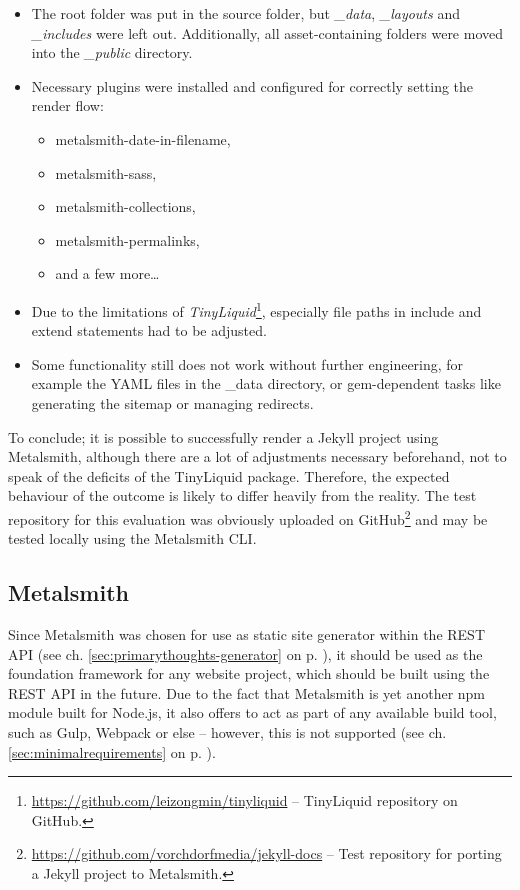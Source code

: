 \begin{itemize}
  \item The root folder was put in the source folder, but \emph{\_data}, \emph{\_layouts} and \emph{\_includes} were left out. Additionally, all asset-containing folders were moved into the \emph{\_public} directory.
  \item Necessary plugins were installed and configured for correctly setting the render flow:
  \begin{itemize}
    \item metalsmith-date-in-filename,
    \item metalsmith-sass,
    \item metalsmith-collections,
    \item metalsmith-permalinks,
    \item and a few more\ldots
  \end{itemize}
  \item Due to the limitations of \emph{TinyLiquid}\footnote{\url{https://github.com/leizongmin/tinyliquid} -- TinyLiquid repository on GitHub.}, especially file paths in include and extend statements had to be adjusted.
  \item Some functionality still does not work without further engineering, for example the YAML files in the \_data directory, or gem-dependent tasks like generating the sitemap or managing redirects.
\end{itemize}

To conclude; it is possible to successfully render a Jekyll project using Metalsmith, although there are a lot of adjustments necessary beforehand, not to speak of the deficits of the TinyLiquid package. Therefore, the expected behaviour of the outcome is likely to differ heavily from the reality. The test repository for this evaluation was obviously uploaded on GitHub\footnote{\url{https://github.com/vorchdorfmedia/jekyll-docs} -- Test repository for porting a Jekyll project to Metalsmith.} and may be tested locally using the Metalsmith CLI.

\subsection{Metalsmith}
Since Metalsmith was chosen for use as static site generator within the REST API (see ch. \ref{sec:primarythoughts-generator} on p. \pageref{sec:primarythoughts-generator}), it should be used as the foundation framework for any website project, which should be built using the REST API in the future. Due to the fact that Metalsmith is yet another npm module built for Node.js, it also offers to act as part of any available build tool, such as Gulp, Webpack or else -- however, this is not supported (see ch. \ref{sec:minimalrequirements} on p. \pageref{sec:minimalrequirements}).

